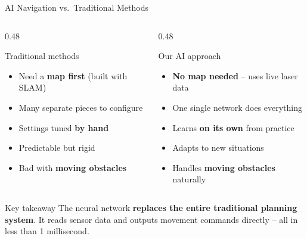 \documentclass[aspectratio=169, 11pt]{beamer}
\begin{document}
\begin{frame}{AI Navigation vs.\ Traditional Methods}

  \begin{columns}[T]
    \begin{column}{0.48\textwidth}
      \begin{block}{Traditional methods}
        \begin{itemize}\small
          \item Need a \textbf{map first} (built with SLAM)
          \item Many separate pieces to configure
          \item Settings tuned \textbf{by hand}
          \item Predictable but rigid
          \item Bad with \textbf{moving obstacles}
        \end{itemize}
      \end{block}
    \end{column}
    \begin{column}{0.48\textwidth}
      \begin{exampleblock}{Our AI approach}
        \begin{itemize}\small
          \item \textbf{No map needed} -- uses live laser data
          \item One single network does everything
          \item Learns \textbf{on its own} from practice
          \item Adapts to new situations
          \item Handles \textbf{moving obstacles} naturally
        \end{itemize}
      \end{exampleblock}
    \end{column}
  \end{columns}

  \vspace{0.3em}

  \begin{alertblock}{Key takeaway}
    \small The neural network \textbf{replaces the entire traditional
    planning system}. It reads sensor data and outputs movement commands
    directly -- all in less than 1 millisecond.
  \end{alertblock}
\end{frame}
\end{document}
